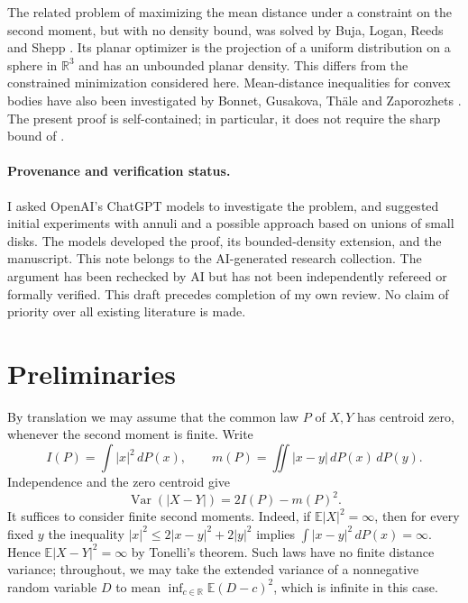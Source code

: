 \documentclass[11pt,a4paper]{amsart}
\theoremstyle{remark}
\newcommand{\E}{\mathbb E}
\newcommand{\R}{\mathbb R}
\newcommand{\Var}{\operatorname{Var}}
\begin{document}
The related problem of maximizing the mean distance under a constraint
on the second moment, but with no density bound, was solved by Buja,
Logan, Reeds and Shepp \cite{BLRS}. Its planar optimizer is the
projection of a uniform distribution on a sphere in $\R^3$ and has
an unbounded planar density. This differs from the constrained
minimization considered here. Mean-distance inequalities for convex
bodies have also been investigated by Bonnet, Gusakova, Th\"ale and
Zaporozhets \cite{BGTZ}. The present proof is self-contained; in
particular, it does not require the sharp bound of \cite{BLRS}.

\paragraph{Provenance and verification status.}
I asked OpenAI's ChatGPT models to investigate the problem, and suggested
initial experiments with annuli and a possible approach based on unions
of small disks. The models developed the proof, its bounded-density
extension, and the manuscript. This note belongs to the AI-generated
research collection. The argument has been rechecked by AI but has not
been independently refereed or formally verified. This draft precedes
completion of my own review. No claim of priority over all existing
literature is made.

\section{Preliminaries}
By translation we may assume that the common law $P$ of $X,Y$ has
centroid zero, whenever the second moment is finite. Write
\[
 I(P)=\int |x|^2\,dP(x),\qquad
 m(P)=\iint |x-y|\,dP(x)\,dP(y).
\]
Independence and the zero centroid give
\begin{equation}\label{eq:variance}
 \Var(|X-Y|)=2I(P)-m(P)^2.
\end{equation}
It suffices to consider finite second moments. Indeed, if
$\E|X|^2=\infty$, then for every fixed $y$ the inequality
$|x|^2\le 2|x-y|^2+2|y|^2$ implies
$\int |x-y|^2\,dP(x)=\infty$. Hence $\E|X-Y|^2=\infty$ by Tonelli's
 theorem. Such laws have no finite distance variance; throughout,
we may take the extended variance of a nonnegative random variable $D$
to mean $\inf_{c\in\R}\E(D-c)^2$, which is infinite in this case.
\end{document}
